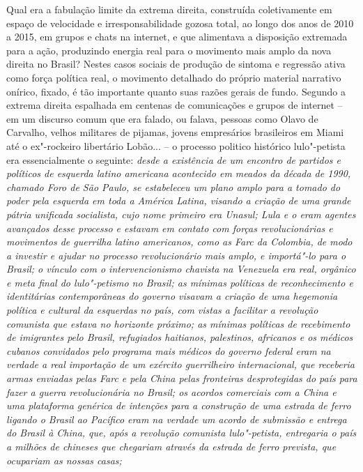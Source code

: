 Qual era a fabulação limite da extrema direita, construída coletivamente
em espaço de velocidade e irresponsabilidade gozosa total, ao longo dos
anos de 2010 a 2015, em grupos e chats na internet, e que alimentava a
disposição extremada para a ação, produzindo energia real para o
movimento mais amplo da nova direita no Brasil? Nestes casos sociais de
produção de sintoma e regressão ativa como força política real, o
movimento detalhado do próprio material narrativo onírico, fixado, é tão
importante quanto suas razões gerais de fundo. Segundo a extrema direita
espalhada em centenas de comunicações e grupos de internet -- em um
discurso comum que era falado, ou falava, pessoas como Olavo de
Carvalho, velhos militares de pijamas, jovens empresários brasileiros em
Miami até o ex"-rockeiro libertário Lobão... -- o processo politico
histórico lulo"-petista era essencialmente o seguinte: \emph{desde a
existência de um encontro de partidos e políticos de esquerda latino
americana acontecido em meados da década de 1990, chamado Foro de São
Paulo, se estabeleceu um plano amplo para a tomado do poder pela
esquerda em toda a América Latina, visando a criação de uma grande
pátria unificada socialista, cujo nome primeiro era Unasul; Lula e o 
eram agentes avançados desse processo e estavam em contato com forças
revolucionárias e movimentos de guerrilha latino americanos, como as
Farc da Colombia, de modo a investir e ajudar no processo revolucionário
mais amplo, e importá"-lo para o Brasil; o vínculo com o intervencionismo
chavista na Venezuela era real, orgânico e meta final do lulo"-petismo no
Brasil; as mínimas políticas de reconhecimento e identitárias
contemporâneas do governo visavam a criação de uma hegemonia política e
cultural da esquerdas no país, com vistas a facilitar a revolução
comunista que estava no horizonte próximo; as mínimas políticas de
recebimento de imigrantes pelo Brasil, refugiados haitianos, palestinos,
africanos e os médicos cubanos convidados pelo programa mais médicos do
governo federal eram na verdade a real importação de um exército
guerrilheiro internacional, que receberia armas enviadas pelas Farc e
pela China pelas fronteiras desprotegidas do país para fazer a guerra
revolucionária no Brasil; os acordos comerciais com a China e uma
plataforma genérica de intenções para a construção de uma estrada de
ferro ligando o Brasil ao Pacífico eram na verdade um acordo de
submissão e entrega do Brasil à China, que, após a revolução comunista
lulo"-petista, entregaria o país a milhões de chineses que chegariam
através da estrada de ferro prevista, que ocupariam as nossas casas;
}

